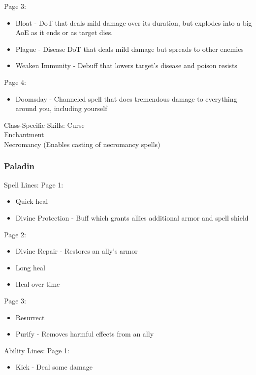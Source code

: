 \documentclass{article}
\begin{document}
Page 3:
\begin{itemize}
    \item Bloat - DoT that deals mild damage over its duration, but explodes into a big AoE as it ends or as
        target dies.
    \item Plague - Disease DoT that deals mild damage but spreads to other enemies
    \item Weaken Immunity - Debuff that lowers target's disease and poison resists
    
\end{itemize}

Page 4:
\begin{itemize}
    \item Doomsday - Channeled spell that does tremendous damage to everything around you, including yourself
\end{itemize}

Class-Specific Skills:
Curse\\
Enchantment\\
Necromancy (Enables casting of necromancy spells)\\


\subsubsection{Paladin}
Spell Lines:
Page 1:
\begin{itemize}
    \item Quick heal
    \item Divine Protection - Buff which grants allies additional armor and spell shield
    
\end{itemize}

Page 2:
\begin{itemize}
    \item Divine Repair - Restores an ally's armor
    \item Long heal
    \item Heal over time
    
\end{itemize}

Page 3:
\begin{itemize}
    \item Resurrect
    \item Purify - Removes harmful effects from an ally
\end{itemize}

Ability Lines:
Page 1:
\begin{itemize}
    \item Kick - Deal some damage
    
\end{itemize}
\end{document}
